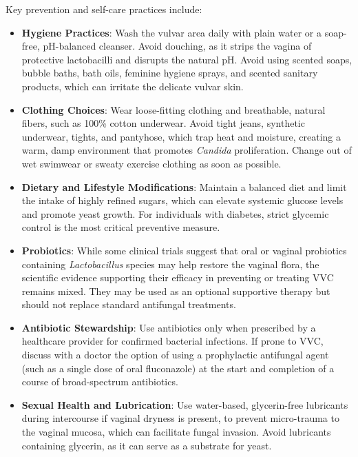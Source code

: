 Key prevention and self-care practices include:
\begin{itemize}
    \item \textbf{Hygiene Practices}: Wash the vulvar area daily with plain water or a soap-free, pH-balanced cleanser. Avoid douching, as it strips the vagina of protective lactobacilli and disrupts the natural pH. Avoid using scented soaps, bubble baths, bath oils, feminine hygiene sprays, and scented sanitary products, which can irritate the delicate vulvar skin.
    \item \textbf{Clothing Choices}: Wear loose-fitting clothing and breathable, natural fibers, such as 100\% cotton underwear. Avoid tight jeans, synthetic underwear, tights, and pantyhose, which trap heat and moisture, creating a warm, damp environment that promotes \textit{Candida} proliferation. Change out of wet swimwear or sweaty exercise clothing as soon as possible.
    \item \textbf{Dietary and Lifestyle Modifications}: Maintain a balanced diet and limit the intake of highly refined sugars, which can elevate systemic glucose levels and promote yeast growth. For individuals with diabetes, strict glycemic control is the most critical preventive measure.
    \item \textbf{Probiotics}: While some clinical trials suggest that oral or vaginal probiotics containing \textit{Lactobacillus} species may help restore the vaginal flora, the scientific evidence supporting their efficacy in preventing or treating VVC remains mixed. They may be used as an optional supportive therapy but should not replace standard antifungal treatments.
    \item \textbf{Antibiotic Stewardship}: Use antibiotics only when prescribed by a healthcare provider for confirmed bacterial infections. If prone to VVC, discuss with a doctor the option of using a prophylactic antifungal agent (such as a single dose of oral fluconazole) at the start and completion of a course of broad-spectrum antibiotics.
    \item \textbf{Sexual Health and Lubrication}: Use water-based, glycerin-free lubricants during intercourse if vaginal dryness is present, to prevent micro-trauma to the vaginal mucosa, which can facilitate fungal invasion. Avoid lubricants containing glycerin, as it can serve as a substrate for yeast.
\end{itemize}

